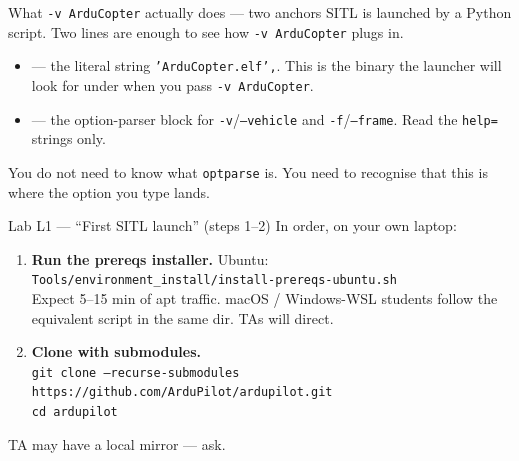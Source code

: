 \documentclass[aspectratio=169,11pt]{beamer}
\begin{document}
\begin{frame}{What \texttt{-v ArduCopter} actually does --- two anchors}
  SITL is launched by a Python script. Two lines are enough to see how \texttt{-v ArduCopter} plugs in.
  \begin{itemize}
    \item {} --- the literal string \texttt{'ArduCopter.elf',}. This is the binary the launcher will look for under  when you pass \texttt{-v ArduCopter}.
    \item {} --- the option-parser block for \texttt{-v}/\texttt{--vehicle} and \texttt{-f}/\texttt{--frame}. Read the \texttt{help=} strings only.
  \end{itemize}
  You do not need to know what \texttt{optparse} is. You need to recognise that this is where the option you type lands.
\end{frame}

\begin{frame}{Lab L1 --- ``First SITL launch'' (steps 1--2)}
  In order, on your own laptop:
  \begin{enumerate}
    \item \textbf{Run the prereqs installer.} Ubuntu: \\
      \texttt{Tools/environment\_install/install-prereqs-ubuntu.sh}\\
      Expect 5--15 min of apt traffic. macOS / Windows-WSL students follow the equivalent script in the same dir. TAs will direct.
    \item \textbf{Clone with submodules.}\\
      \texttt{git clone --recurse-submodules https://github.com/ArduPilot/ardupilot.git}\\
      \texttt{cd ardupilot}
  \end{enumerate}
  TA may have a local mirror --- ask.
\end{frame}
\end{document}
